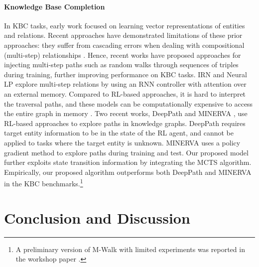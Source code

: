 \documentclass{article}
\begin{document}
\paragraph{Knowledge Base Completion}
	In KBC tasks, early work \cite{bordes2013translating} focused on learning vector representations of entities and relations. 
	Recent approaches have demonstrated limitations of these prior approaches: they suffer from cascading errors when dealing with compositional (multi-step) relationships \cite{GuuMiLi15}.
	Hence, recent works \cite{gardner2014incorporating, neelakantan2015compositional, GuuMiLi15, PTransE2015EMNLP, KristinaQu16} have proposed approaches for injecting multi-step paths such as random walks through sequences of triples during training, further improving performance on KBC tasks.
	IRN \cite{shen2017modeling} and Neural LP \cite{yang2017differentiable} explore multi-step relations by using an RNN controller with attention over an external memory. 
	Compared to RL-based approaches, it is hard to interpret the traversal paths, and these models can be computationally expensive to access the entire graph in memory \cite{shen2017modeling}.
	Two recent works, DeepPath \cite{DeepPath} and MINERVA \cite{GoforaWalk}, use RL-based approaches to explore paths in knowledge graphs. 
	DeepPath requires target entity information to be in the state of the RL agent, and cannot be applied to tasks where the target entity is unknown.
MINERVA \cite{GoforaWalk} uses a policy gradient method to explore paths during training and test.
	Our proposed model further exploits state transition information by integrating the MCTS algorithm. 
	Empirically, our proposed algorithm outperforms both DeepPath and MINERVA in the KBC benchmarks.\footnote{A preliminary version of M-Walk with limited experiments was reported in the workshop paper \cite{shen2018reinforcewalk}.}
	
	
	


	
\section{Conclusion and Discussion}
\label{Sec:Conclusion}
	
\end{document}

